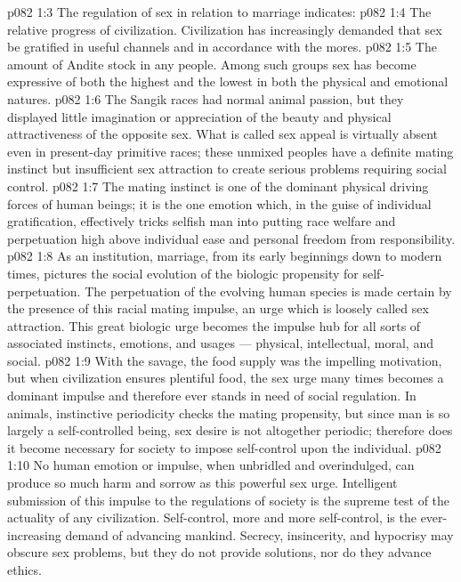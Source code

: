 \vs p082 1:3 \pc The regulation of sex in relation to marriage indicates:
\vs p082 1:4 \bibnobreakspace The relative progress of civilization. Civilization has increasingly demanded that sex be gratified in useful channels and in accordance with the mores.
\vs p082 1:5 \bibnobreakspace The amount of Andite stock in any people. Among such groups sex has become expressive of both the highest and the lowest in both the physical and emotional natures.
\vs p082 1:6 \pc The Sangik races had normal animal passion, but they displayed little imagination or appreciation of the beauty and physical attractiveness of the opposite sex. What is called sex appeal is virtually absent even in present\hyp{}day primitive races; these unmixed peoples have a definite mating instinct but insufficient sex attraction to create serious problems requiring social control.
\vs p082 1:7 The mating instinct is one of the dominant physical driving forces of human beings; it is the one emotion which, in the guise of individual gratification, effectively tricks selfish man into putting race welfare and perpetuation high above individual ease and personal freedom from responsibility.
\vs p082 1:8 As an institution, marriage, from its early beginnings down to modern times, pictures the social evolution of the biologic propensity for self\hyp{}perpetuation. The perpetuation of the evolving human species is made certain by the presence of this racial mating impulse, an urge which is loosely called sex attraction. This great biologic urge becomes the impulse hub for all sorts of associated instincts, emotions, and usages --- physical, intellectual, moral, and social.
\vs p082 1:9 With the savage, the food supply was the impelling motivation, but when civilization ensures plentiful food, the sex urge many times becomes a dominant impulse and therefore ever stands in need of social regulation. In animals, instinctive periodicity checks the mating propensity, but since man is so largely a self\hyp{}controlled being, sex desire is not altogether periodic; therefore does it become necessary for society to impose self\hyp{}control upon the individual.
\vs p082 1:10 No human emotion or impulse, when unbridled and overindulged, can produce so much harm and sorrow as this powerful sex urge. Intelligent submission of this impulse to the regulations of society is the supreme test of the actuality of any civilization. Self\hyp{}control, more and more self\hyp{}control, is the ever\hyp{}increasing demand of advancing mankind. Secrecy, insincerity, and hypocrisy may obscure sex problems, but they do not provide solutions, nor do they advance ethics.
